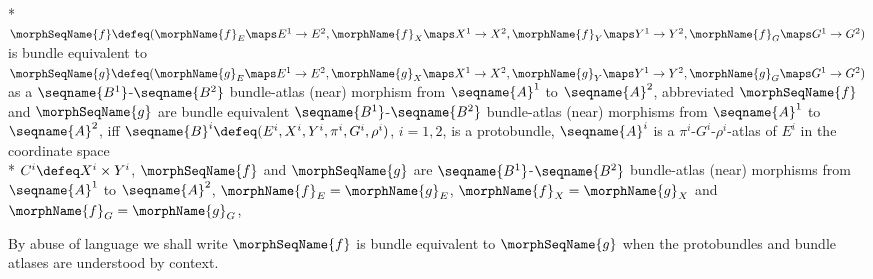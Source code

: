 \documentclass{article}
\begin{document}
\begin{definition}
\label{def:Bun-ATLmorphequiv}
\leavevmode \\*
$
  \morphSeqName{f}
  \defeq
  (
    \morphName{f}_E \maps E^1 \to E^2,
    \morphName{f}_X \maps X^1 \to X^2,
    \morphName{f}_Y \maps Y^1 \to Y^2,
    \morphName{f}_G \maps G^1 \to G^2
  )
$
is bundle equivalent to
$
  \morphSeqName{g}
  \defeq
  (
    \morphName{g}_E \maps E^1 \to E^2,
    \morphName{g}_X \maps X^1 \to X^2,
    \morphName{g}_Y \maps Y^1 \to Y^2,
    \morphName{g}_G \maps G^1 \to G^2
  )
$
as a $\seqname{B^1}$-$\seqname{B^2}$ bundle-atlas (near) morphism from
$\seqname{A}^1$ to $\seqname{A}^2$, abbreviated $\morphSeqName{f}$ and
$\morphSeqName{g}$ are bundle equivalent $\seqname{B^1}$-$\seqname{B^2}$
bundle-atlas (near) morphisms from $\seqname{A}^1$ to $\seqname{A}^2$, iff
$
  \seqname{B}^i
  \defeq
  (
    E^i,
    X^i,
    Y^i,
    \pi^i,
    G^i,
    \rho^i
  )
$,
$i=1,2$, is a protobundle, $\seqname{A}^i$ is a
$\pi^i$-$G^i$-$\rho^i$-atlas of $E^i$ in the coordinate space \\*
$C^i \defeq X^i \times Y^i$, $\morphSeqName{f}$ and $\morphSeqName{g}$ are
$\seqname{B^1}$-$\seqname{B^2}$ bundle-atlas (near) morphisms from
$\seqname{A}^1$ to $\seqname{A}^2$, $\morphName{f}_E = \morphName{g}_E$,
$\morphName{f}_X = \morphName{g}_X$ and $\morphName{f}_G = \morphName{g}_G$,

By abuse of language we shall write $\morphSeqName{f}$ is bundle
equivalent to $\morphSeqName{g}$ when the protobundles and bundle
atlases are understood by context.
\end{definition}
\end{document}
